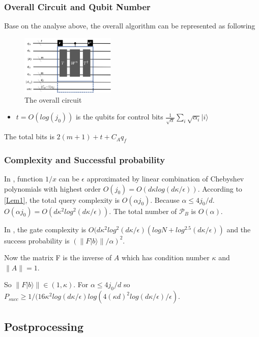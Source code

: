 \documentclass[%
 reprint,
 amsmath,amssymb,
pra,
]{revtex4-1}
\begin{document}
\subsubsection{Overall Circuit and Qubit Number}
Base on the analyse above, the overall algorithm can be represented as 
following
\begin{figure}[htbp]
\centering
\includegraphics[width=0.4\textwidth]{Fig/overall}
\caption{The overall circuit}
\label{o}
\end{figure}
\begin{itemize}
\item $t=O(log(j_0))$ is the qubits for control bits  $\frac{1}
{\sqrt{\alpha}}\sum_i\sqrt{\alpha_i}|i\rangle$
\end{itemize}
The total bits is $2(m+1)+t+C_Aq_f$

\subsubsection{Complexity and Successful probability}
In \cite{doi:10.1137/16M1087072}, function $1/x$ can be $\epsilon$ approximated by
linear combination of Chebyshev polynomials with highest order 
$O(j_0)=O(d\kappa log(d\kappa/\epsilon))$. According to \ref{Lem1}, the total
query complexity is $O(\alpha j_0)$. Because $\alpha\leqslant 4j_0/d$.
$O(\alpha j_0)=O(d\kappa^2log^2(d\kappa/\epsilon))$. The total number of 
$\mathcal{P}_B$ is $O(\alpha)$.

In \cite{7354428}, the gate complexity is $O(d\kappa^2log^2(d\kappa/
\epsilon)(logN+log^{2.5}(d\kappa/\epsilon))$
and the success probability is 
$(\lVert F|b\rangle\rVert/\alpha)^2$. 

Now the matrix F is the inverse of $A$ 
which has condition number $\kappa$ and $\lVert A\rVert=1$. 

So $\lVert F|b\rangle\rVert\in (1, \kappa)$. For $\alpha\leqslant4j_0/d$ so
$P_{succ}\geqslant 1/(16\kappa^2 log(d\kappa/\epsilon) log(4(\kappa d)^2log(d
\kappa/\epsilon)/\epsilon)$. 


\subsection{Postprocessing}
\end{document}
